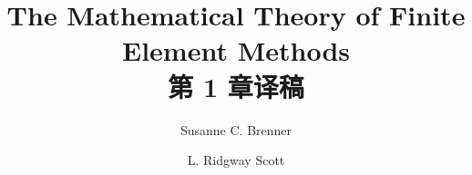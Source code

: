 \documentclass[a4paper,UTF8,12pt]{ctexart}
\title{The Mathematical Theory of Finite Element Methods\\第 1 章译稿}
\author{Susanne C. Brenner \and L. Ridgway Scott}
\date{}
\begin{document}
\maketitle
\setcounter{section}{0}
\renewcommand{\thethmcount}{\thesubsection.\arabic{thmcount}}
\renewcommand{\theequation}{\thesubsection.\arabic{equation}}
\renewcommand{\thefigure}{\thesection.\arabic{figure}}
\renewcommand{\thetable}{\thesection.\arabic{table}}

\end{document}
